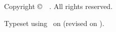 %
%
%
\thispagestyle{empty}
\vspace*{\fill}

\begin{itshape}
    \small
    \makeatletter
    Copyright \copyright\ \@dtm@ini@year\ \theauthor.
    \makeatother
    All rights reserved.\par
    Typeset using \LaTeXe\ on  (revised on ).%
\end{itshape}
